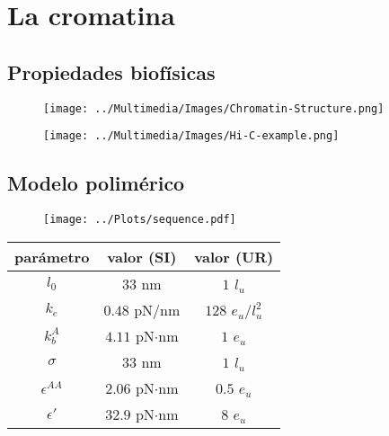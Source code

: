 \documentclass{beamer}
\begin{document}
\section{La cromatina}

\subsection{Propiedades biofísicas}

\begin{frame}
    \begin{figure}
        \centering
        \texttt{[image: ../Multimedia/Images/Chromatin-Structure.png]}
    \end{figure}
\end{frame}

\begin{frame}
    \begin{figure}
        \centering
        \texttt{[image: ../Multimedia/Images/Hi-C-example.png]}
    \end{figure}
\end{frame}

\subsection{Modelo polimérico}

\begin{frame}
    \begin{figure}
        \centering
        \texttt{[image: ../Plots/sequence.pdf]}
    \end{figure}
\end{frame}

\begin{frame}
    \begin{table}
        \centering
        \begin{tabular}{c c c}
            \toprule
            parámetro       & valor (SI)         & valor (UR)          \\
            \midrule
            $l_0$           & $33$ nm            & $1$ $l_u$           \\
            $k_e$           & $0.48$ pN/nm       & $128$ $e_u$/$l_u^2$ \\
            $k_b^A$         & $4.11$ pN$\cdot$nm & $1$ $e_u$           \\
            $\sigma$        & $33$ nm            & $1$ $l_u$           \\
            $\epsilon^{AA}$ & $2.06$ pN$\cdot$nm & $0.5$ $e_u$         \\
            $\epsilon'$     & $32.9$ pN$\cdot$nm & $8$ $e_u$           \\
            \bottomrule
        \end{tabular}
    \end{table}
\end{frame}
\end{document}
